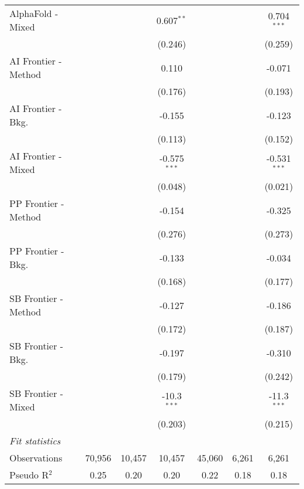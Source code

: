 \begin{tabular}{lcccccc}
   AlphaFold - Mixed    &               &               & 0.607$^{**}$   &               &               & 0.704$^{***}$\\   
                        &               &               & (0.246)        &               &               & (0.259)\\   
   AI Frontier - Method &               &               & 0.110          &               &               & -0.071\\   
                        &               &               & (0.176)        &               &               & (0.193)\\   
   AI Frontier - Bkg.   &               &               & -0.155         &               &               & -0.123\\   
                        &               &               & (0.113)        &               &               & (0.152)\\   
   AI Frontier - Mixed  &               &               & -0.575$^{***}$ &               &               & -0.531$^{***}$\\   
                        &               &               & (0.048)        &               &               & (0.021)\\   
   PP Frontier - Method &               &               & -0.154         &               &               & -0.325\\   
                        &               &               & (0.276)        &               &               & (0.273)\\   
   PP Frontier - Bkg.   &               &               & -0.133         &               &               & -0.034\\   
                        &               &               & (0.168)        &               &               & (0.177)\\   
   SB Frontier - Method &               &               & -0.127         &               &               & -0.186\\   
                        &               &               & (0.172)        &               &               & (0.187)\\   
   SB Frontier - Bkg.   &               &               & -0.197         &               &               & -0.310\\   
                        &               &               & (0.179)        &               &               & (0.242)\\   
   SB Frontier - Mixed  &               &               & -10.3$^{***}$  &               &               & -11.3$^{***}$\\   
                        &               &               & (0.203)        &               &               & (0.215)\\   
   \midrule
   \emph{Fit statistics}\\
   Observations         & 70,956        & 10,457        & 10,457         & 45,060        & 6,261         & 6,261\\  
   Pseudo R$^2$         & 0.25          & 0.20          & 0.20           & 0.22          & 0.18          & 0.18\\  
   

\end{tabular}
